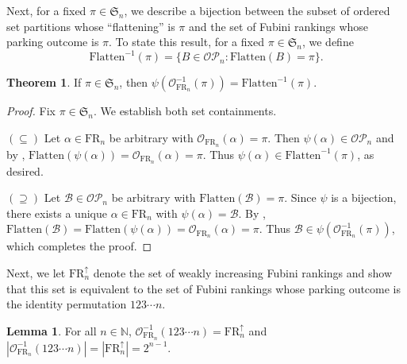\documentclass{amsart}
\newcommand{\Flatten}[0]{\mathrm{Flatten}}
\theoremstyle{definition}
\newtheorem{theorem}{Theorem}[section]
\newtheorem{lemma}{Lemma}[section]
\theoremstyle{definition}
\theoremstyle{remark}
\newcommand{\FR}[1]{\mathrm{FR}_{#1}}
\newcommand{\out}{\mathcal{O}}
\newcommand{\Sym}{\mathfrak{S}}
\begin{document}
Next, for a fixed $\pi \in \Sym_n$, we describe a bijection between the subset of ordered set partitions whose ``flattening'' is $\pi$ and the set of Fubini rankings whose parking outcome is $\pi$.
To state this result, for a fixed $\pi\in\Sym_{n}$, we define 
\[\Flatten^{-1}(\pi)=\{B\in\mathcal{OP}_n:\Flatten(B)=\pi \}.\]
\begin{theorem}\label{thm: OSP preimage = flatten preimage}
    If $\pi\in\Sym_n$, then 
    $\psi(\out_{\FR{n}}^{-1}(\pi))=\Flatten^{-1}(\pi)$.
\end{theorem}
\begin{proof}
    Fix $\pi\in\Sym_n$. We establish both set containments.
    
    
    \noindent $(\subseteq)$ Let $\alpha\in\FR{n}$ be arbitrary  with $\out_{\FR{n}}(\alpha)=\pi$. 
    Then $\psi(\alpha)\in\mathcal{OP}_n$ and
    by , $\Flatten(\psi(\alpha))=\out_{\FR{n}}(\alpha)=\pi$.
    Thus $\psi(\alpha)\in\Flatten^{-1}(\pi)$, as desired.
    
    
    \noindent $(\supseteq)$ Let $\mathcal{B}\in\mathcal{OP}_n$ be arbitrary with $\Flatten(\mathcal{B})=\pi$. Since $\psi$ is a bijection, there exists a unique $\alpha\in\FR{n}$ with $\psi(\alpha)=\mathcal{B}$. By , $\Flatten(\mathcal{B})=\Flatten(\psi(\alpha))=\out_{\FR{n}}(\alpha)=\pi$. Thus $\mathcal{B}\in\psi(\out_{\FR{n}}^{-1}(\pi))$, which completes the proof.
\end{proof}
Next, we let $\FR{n}^\uparrow$ denote the set of weakly increasing Fubini rankings and show that this set is equivalent to the set of Fubini rankings whose parking outcome is the identity permutation $123\cdots n$.
\begin{lemma}\label{lem:weakly increasing Fubinis park in identity order}
    For all $n\in\mathbb{N}$, $\out^{-1}_{\FR{n}}(123\cdots n)=\FR{n}^\uparrow$ and $|\out^{-1}_{\FR{n}}(123\cdots n)|=|\FR{n}^\uparrow|=2^{n-1}$.
\end{lemma}
\end{document}
